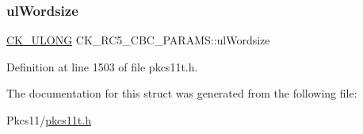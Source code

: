 \mbox{\label{struct_c_k___r_c5___c_b_c___p_a_r_a_m_s_a8c73bb58423c42d45a96a32c206c408a}} 
\subsubsection{\texorpdfstring{ul\+Wordsize}{ulWordsize}}
{\footnotesize\ttfamily \hyperlink{pkcs11t_8h_a35181858a3b7a0a81f49d180d8f446ef}{C\+K\+\_\+\+U\+L\+O\+NG} C\+K\+\_\+\+R\+C5\+\_\+\+C\+B\+C\+\_\+\+P\+A\+R\+A\+M\+S\+::ul\+Wordsize}



Definition at line 1503 of file pkcs11t.\+h.



The documentation for this struct was generated from the following file\+:\begin{DoxyCompactItemize}
\item 
Pkcs11/\hyperlink{pkcs11t_8h}{pkcs11t.\+h}\end{DoxyCompactItemize}

